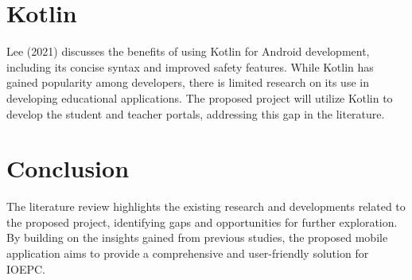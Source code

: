 \section{Kotlin}
Lee (2021) discusses the benefits of using Kotlin for Android development, including its concise syntax and improved safety features. While Kotlin has gained popularity among developers, there is limited research on its use in developing educational applications. The proposed project will utilize Kotlin to develop the student and teacher portals, addressing this gap in the literature.

\section{Conclusion}
The literature review highlights the existing research and developments related to the proposed project, identifying gaps and opportunities for further exploration. By building on the insights gained from previous studies, the proposed mobile application aims to provide a comprehensive and user-friendly solution for IOEPC.